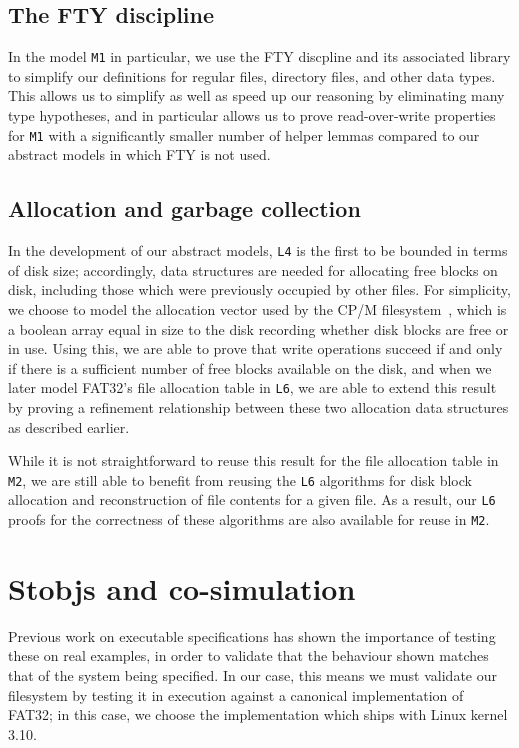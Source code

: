 \documentclass[submission,copyright,creativecommons]{eptcs}
\begin{document}
\subsection{The FTY discipline}

In the model \texttt{M1} in particular, we use the FTY discpline and
its associated library \cite{15-swords-fty} to simplify our
definitions for regular files,
directory files, and other data types. This allows us to simplify as
well as speed up our reasoning by eliminating many type hypotheses,
and in particular allows us to prove read-over-write properties for
\texttt{M1} with a significantly smaller number of helper lemmas
compared to our abstract models in which FTY is not used.

\subsection{Allocation and garbage collection}

In the development of our abstract models, \texttt{L4} is the first to
be bounded in terms of disk size; accordingly, data structures are
needed for allocating free blocks on disk, including those which were
previously occupied by other files. For simplicity, we choose to model
the allocation vector used by the CP/M filesystem~\cite{moriacpm},
which is a boolean
array equal in size to the disk recording whether disk blocks are free
or in use. Using this, we are able to prove that write operations
succeed if and only if there is a sufficient number of free blocks
available on the disk, and when we later model FAT32's file allocation
table in \texttt{L6}, we are able to extend this result by proving a
refinement relationship between these two allocation data structures
as described earlier.

While it is not straightforward to reuse this result for the file
allocation table in \texttt{M2}, we are still able to benefit from
reusing the \texttt{L6} algorithms for disk block allocation and
reconstruction of file contents for a given file. As a result, our
\texttt{L6} proofs for the correctness of these algorithms are also
available for reuse in \texttt{M2}.

\section{Stobjs and co-simulation}

Previous work on executable specifications \cite{goel2014simulation}
has shown the importance of testing these on real examples, in order
to validate that the behaviour shown matches that of the system being
specified. In our case, this means we must validate our filesystem by
testing it in execution against a canonical implementation of FAT32;
in this case, we choose the implementation which ships with Linux
kernel 3.10.
\end{document}

